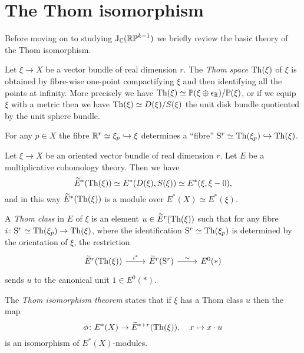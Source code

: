 
\section{The Thom isomorphism}

Before moving on to studying $\mathrm{J}_{\mathbb{C}}(\mathbb{RP}^{k-1})$ we briefly review the
basic theory of the Thom isomorphism.

\begin{definition}
  \label{thom-space}
  Let $\xi \to X$ be a vector bundle of real dimension $r$. The
  \emph{Thom space} $\operatorname{Th}(\xi)$ of $\xi$ is obtained by fibre-wise
  one-point compactifying $\xi$ and then identifying all the points at
  infinity. More precisely we have $\operatorname{Th}(\xi) \simeq \mathbb{P}(\xi \oplus
  \epsilon_{\mathbb{R}})/\mathbb{P}(\xi)$, or if we equip $\xi$ with a metric then we
  have $\operatorname{Th}(\xi) \simeq D(\xi)/S(\xi)$ the unit disk bundle quotiented
  by the unit sphere bundle.
\end{definition}

\begin{remark}
  \label{thom-fibre}
  For any $p \in X$ the fibre $\mathbb{R}^r \simeq \xi_p \hookrightarrow \xi$ determines
  a ``fibre'' $\mathrm{S}^r \simeq \operatorname{Th}(\xi_p) \hookrightarrow \operatorname{Th}(\xi)$.
\end{remark}

\begin{nothing}
  \label{thom-iso}
  Let $\xi \to X$ be an oriented vector bundle of real dimension
  $r$. Let $E$ be a multiplicative cohomology theory. Then we have
  \[
  \widetilde E^*(\operatorname{Th}(\xi)) \simeq E^*(D(\xi),S(\xi)) \simeq E^*(\xi, \xi-0),
  \]
  and in this way $\widetilde E^*(\operatorname{Th}(\xi))$ is a module over $E^*(X) \simeq
  E^*(\xi)$.
  
  A \emph{Thom class} in $E$ of $\xi$ is an element $u \in \widetilde
  E^r(\operatorname{Th}(\xi))$ such that for any fibre $i \colon \mathrm{S}^r \simeq \operatorname{Th}(\xi_p)
  \to \operatorname{Th}(\xi)$, where the identification $\mathrm{S}^r \simeq \operatorname{Th}(\xi_p)$ is
  determined by the orientation of $\xi$, the restriction
  \[
  \begin{tikzcd}
    \wt E^r(\Th(\xi)) \rar{i^*} & \wt E^r(\S^r) \rar{\sim} & E^0(*)
  \end{tikzcd}
  \]
  sends $u$ to the canonical unit $1 \in E^0(*)$.
  
  The \emph{Thom isomorphism theorem} states that if $\xi$ has a Thom
  class $u$ then the map
  \[
  \phi \colon E^*(X) \to \widetilde E^{*+r}(\operatorname{Th}(\xi)), \quad x \mapsto x \cdot u
  \]
  is an isomorphism of $E^*(X)$-modules.
\end{nothing}

